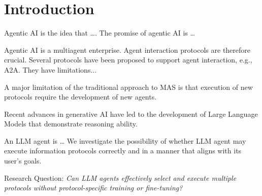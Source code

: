 \documentclass[runningheads]{llncs}
\begin{document}

\section{Introduction}\label{Introduction}
Agentic AI is the idea that \ldots.  The promise of agentic AI is \ldots

Agentic AI is a multiagent enterprise. Agent interaction protocols are therefore crucial.  Several protocols have been proposed to support agent interaction, e.g., A2A.  They have limitations...

A major limitation of the traditional approach to MAS is that execution of new protocols require the development of new agents.


Recent advances in generative AI have led to the development of Large Language Models that demonstrate reasoning ability.

An LLM agent is \ldots
We investigate the possibility of whether LLM agent may execute information protocols correctly and in a manner that aligns with its user's goals. 





Research Question:
\textit{Can LLM agents effectively select and execute multiple protocols without protocol-specific training or fine-tuning?}
\end{document}
